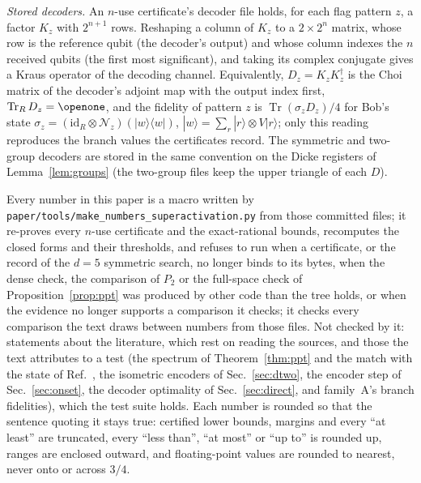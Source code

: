\documentclass[aps,pra,twocolumn,superscriptaddress,nofootinbib,longbibliography,floatfix]{revtex4-2}
\newcommand{\ket}[1]{|#1\rangle}
\newcommand{\proj}[1]{|#1\rangle\langle #1|}
\newcommand{\tr}{\operatorname{Tr}}
\newcommand{\id}{\mathrm{id}}
\begin{document}
{\raggedright\emph{Stored decoders.} An $n$-use certificate's decoder file holds, for each flag pattern $z$, a factor $K_z$ with $2^{n+1}$ rows. Reshaping a column of $K_z$ to a $2\times2^n$ matrix, whose row is the reference qubit (the decoder's output) and whose column indexes the $n$ received qubits (the first most significant), and taking its complex conjugate gives a Kraus operator of the decoding channel. Equivalently, $D_z=K_zK_z^\dagger$ is the Choi matrix of the decoder's adjoint map with the output index first, $\tr_RD_z=\openone$, and the fidelity of pattern $z$ is $\tr(\sigma_zD_z)/4$ for Bob's state $\sigma_z=(\id_R\otimes\mathcal N_z)(\proj w)$, $\ket w=\sum_r\ket r\otimes V\ket r$; only this reading reproduces the branch values the certificates record. The symmetric and two-group decoders are stored in the same convention on the Dicke registers of Lemma~\ref{lem:groups} (the two-group files keep the upper triangle of each $D$).\par}

{\raggedright Every number in this paper is a macro written by \texttt{paper/\allowbreak tools/\allowbreak make\_numbers\_superactivation.py} from those committed files; it re-proves every $n$-use certificate and the exact-rational bounds, recomputes the closed forms and their thresholds, and refuses to run when a certificate, or the record of the $d=5$ symmetric search, no longer binds to its bytes, when the dense check, the comparison of $P_2$ or the full-space check of Proposition~\ref{prop:ppt} was produced by other code than the tree holds, or when the evidence no longer supports a comparison it checks; it checks every comparison the text draws between numbers from those files. Not checked by it: statements about the literature, which rest on reading the sources, and those the text attributes to a test (the spectrum of Theorem~\ref{thm:ppt} and the match with the state of Ref.~\cite{horodecki2008low}, the isometric encoders of Sec.~\ref{sec:dtwo}, the encoder step of Sec.~\ref{sec:onset}, the decoder optimality of Sec.~\ref{sec:direct}, and family~A's branch fidelities), which the test suite holds. Each number is rounded so that the sentence quoting it stays true: certified lower bounds, margins and every ``at least'' are truncated, every ``less than'', ``at most'' or ``up to'' is rounded up, ranges are enclosed outward, and floating-point values are rounded to nearest, never onto or across $3/4$.\par}
\end{document}
